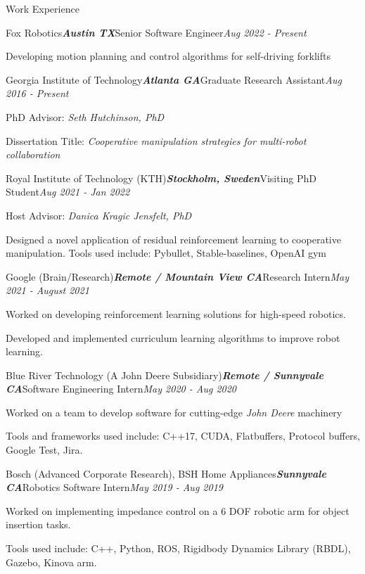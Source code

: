 \documentclass{resume} %
\begin{document}
\begin{rSection}{Work Experience}
\begin{rSubsection}{Fox Robotics}{\bf \em Austin TX}{Senior Software Engineer}{\em Aug 2022 - Present}
\item Developing motion planning and control algorithms for self-driving forklifts
\end{rSubsection}

\begin{rSubsection}{Georgia Institute of Technology}{\bf \em Atlanta GA}{Graduate Research Assistant}{\em Aug 2016 - Present}
\item PhD Advisor: {\em Seth Hutchinson, PhD}
\item Dissertation Title: {\em Cooperative manipulation strategies for multi-robot collaboration}
\end{rSubsection}

\begin{rSubsection}{Royal Institute of Technology (KTH)}{\bf \em Stockholm, Sweden}{Visiting PhD Student}{\em Aug 2021 - Jan 2022}
\item Host Advisor: {\em Danica Kragic Jensfelt, PhD}
\item Designed a novel application of residual reinforcement learning to cooperative manipulation. Tools used include: Pybullet, Stable-baselines, OpenAI gym
\end{rSubsection}

\begin{rSubsection}{Google (Brain/Research)}{\bf \em Remote / Mountain View CA}{Research Intern}{\em May 2021 - August 2021}
\item Worked on developing reinforcement learning solutions for high-speed robotics.
\item Developed and implemented curriculum learning algorithms to improve robot learning.
\end{rSubsection}

\begin{rSubsection}{Blue River Technology (A John Deere Subsidiary)}{\bf \em Remote / Sunnyvale CA}{Software Engineering Intern}{\em May 2020 - Aug 2020}
\item Worked on a team to develop software for cutting-edge {\em John Deere} machinery
\item Tools and frameworks used include: C++17, CUDA, Flatbuffers, Protocol buffers, Google Test, Jira.
\end{rSubsection}

\begin{rSubsection}{Bosch (Advanced Corporate Research), BSH Home Appliances}{\bf \em Sunnyvale CA}{Robotics Software Intern}{\em May 2019 - Aug 2019}
\item Worked on implementing impedance control on a 6 DOF robotic arm for object insertion tasks.
\item Tools used include: C++, Python, ROS, Rigidbody Dynamics Library (RBDL), Gazebo, Kinova arm.
\end{rSubsection}


\end{rSection}
\end{document}
